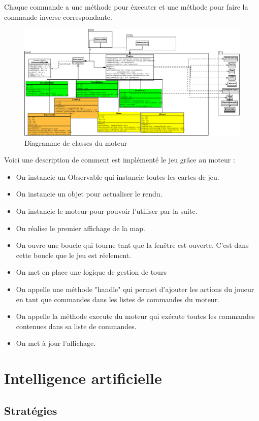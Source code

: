 \documentclass[12pt,a4paper]{article}
\begin{document}
Chaque commande a une méthode pour éxecuter et une méthode pour faire la commande inverse correspondante.
\begin{figure}[!ht]
\centering
    \includegraphics[width=1\textwidth]{ressources/engine.png}
     \caption{Diagramme de classes du moteur}
\end{figure}
\newpage
Voici une description de comment est implémenté le jeu grâce au moteur : \begin{itemize}
    \item On instancie un Observable qui instancie toutes les cartes de jeu.
    \item On instancie un objet pour actualiser le rendu. 
    \item On instancie le moteur pour pouvoir l'utiliser par la suite.
    \item On réalise le premier affichage de la map. 
    \item On ouvre une boucle qui tourne tant que la fenêtre est ouverte. C'est dans cette boucle que le jeu est réelement. 
    \item On met en place une logique de gestion de tours
    \item On appelle une méthode "handle" qui permet d'ajouter les actions du joueur en tant que commandes dans les listes de commandes du moteur. 
    \item On appelle la méthode execute du moteur qui exécute toutes les commandes contenues dans sa liste de commandes.
    \item On met à jour l'affichage. 
\end{itemize}
\newpage
\section{Intelligence artificielle}

\subsection{Stratégies}
\end{document}
